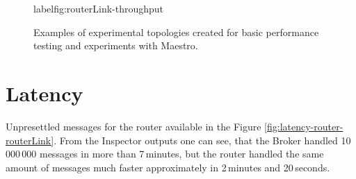 \begin{figure}[h]
	\centering
	\begin{minipage}{0.49\linewidth}
	\end{minipage}
	\begin{minipage}{0.49\linewidth}
	\end{minipage}
	\caption[Examples of experimental topologies created for basic performance testing and experiments with Maestro.]{Examples of experimental topologies created for basic performance testing and experiments with Maestro.}
  label{fig:routerLink-throughput}
\end{figure}

\section*{Latency}

Unpresettled messages for the router available in the Figure \ref{fig:latency-router-routerLink}. From the Inspector outputs one can see, that the Broker handled 10\,000\,000 messages in more than 7\,minutes, but the router handled the same amount of messages much faster approximately in 2\,minutes and 20\,seconds.

